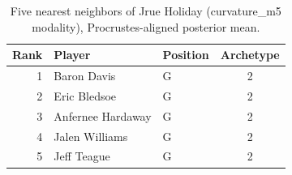 \begin{table}[htbp]
  \centering\small
  \begin{tabular}{rllc}
    \toprule
    Rank & Player & Position & Archetype \\
    \midrule
    1 & Baron Davis & G & 2 \\
    2 & Eric Bledsoe & G & 2 \\
    3 & Anfernee Hardaway & G & 2 \\
    4 & Jalen Williams & G & 2 \\
    5 & Jeff Teague & G & 2 \\
    \bottomrule
  \end{tabular}
  \caption{Five nearest neighbors of Jrue Holiday (curvature_m5 modality), Procrustes-aligned posterior mean.}
  \label{tab:Jrue_Holiday_neighbors_curvature_m5}
\end{table}

